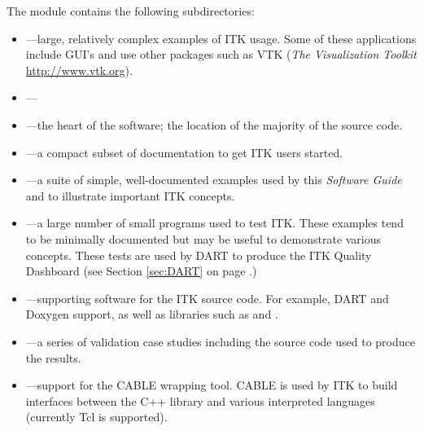 The  module contains the following subdirectories:
\begin{itemize}
        \item {}---large, relatively complex examples
        of ITK usage. Some of these applications include GUI's and use other
        packages such as VTK (\emph{The Visualization Toolkit} 
        \url{http://www.vtk.org}).
        \item {}---
        \item {}---the heart of the software; the location
        of the majority of the source code.
        \item {}---a compact subset of documentation
        to get ITK users started.
        \item {}---a suite of simple, well-documented
        examples used by this \emph{Software Guide} and to illustrate important
        ITK concepts.
        \item {}---a large number of small programs used
        to test ITK. These examples tend to be minimally documented but may
        be useful to demonstrate various concepts. These tests are used by DART
        to produce the ITK Quality Dashboard (see Section \ref{sec:DART} on 
        page \pageref{sec:DART}.)
        \item {}---supporting software for the ITK
        source code. For example, DART and Doxygen support, as well as 
        libraries such as  and .
        \item {}---a series of validation case studies
        including the source code used to produce the results.
        \item {}---support for the CABLE wrapping tool.
        CABLE is used by ITK to build interfaces between the C++ library and
        various interpreted languages (currently Tcl is supported).
\end{itemize}

